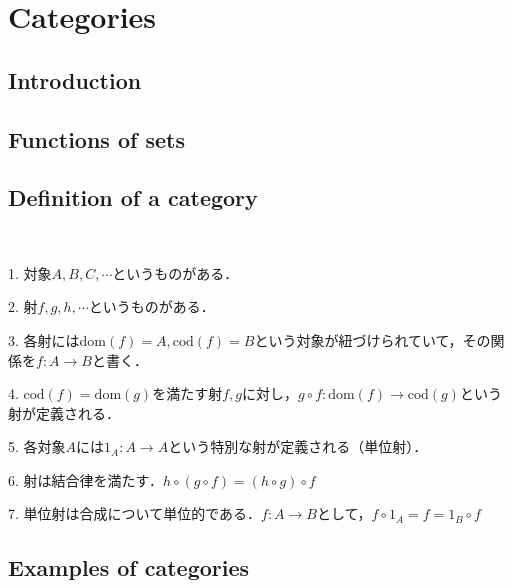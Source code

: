 \documentclass[uplatex, dvipdfmx]{jsarticle}
\title{}
\author{司馬博文 J4-190549\\hirofumi-shiba48@g.ecc.u-tokyo.ac.jp}
\date{\today}
\begin{document}
\tableofcontents

\section{Categories}

\subsection{Introduction}
\subsection{Functions of sets}
\subsection{Definition of a category}
\begin{definition}[Category]　

    1. 対象$A,B,C,\cdots$というものがある．

    2. 射$f,g,h,\cdots$というものがある．

    3. 各射には$\mathrm{dom}(f)=A, \mathrm{cod}(f)=B$という対象が紐づけられていて，その関係を$f:A\to B$と書く．

    4. $\mathrm{cod}(f)=\mathrm{dom}(g)$を満たす射$f,g$に対し，$g\circ f:\mathrm{dom}(f)\to \mathrm{cod}(g)$という射が定義される．

    5. 各対象$A$には$1_A:A\to A$という特別な射が定義される（単位射）．

    6. 射は結合律を満たす．$h\circ (g\circ f)=(h\circ g)\circ f$

    7. 単位射は合成について単位的である．$f:A\to B$として，$f\circ 1_A=f=1_B\circ f$
\end{definition}

\subsection{Examples of categories}
\end{document}
